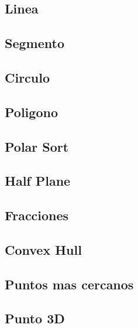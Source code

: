 \subsection{Linea}
\raggedbottom
\hrulefill
\subsection{Segmento}
\raggedbottom
\hrulefill
\subsection{Circulo}
\raggedbottom
\hrulefill
\subsection{Poligono}
\raggedbottom
\hrulefill
\subsection{Polar Sort}
\raggedbottom
\hrulefill
\subsection{Half Plane}
\raggedbottom
\hrulefill
\subsection{Fracciones}
\raggedbottom
\hrulefill
\subsection{Convex Hull}
\raggedbottom
\hrulefill
\subsection{Puntos mas cercanos}
\raggedbottom
\hrulefill
\subsection{Punto 3D}
\raggedbottom
\hrulefill
\newpage

